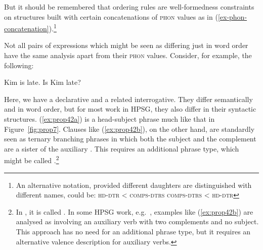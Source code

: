 \documentclass[output=paper,biblatex,babelshorthands,newtxmath,draftmode,colorlinks,citecolor=brown]{langscibook}
\begin{document}
\eal\label{ex:prop41}
\ex\label{ex:prop41a}
\ex\label{ex:prop41b}
\zl
%
But it should be remembered that ordering rules are well-formedness constraints on structures built with certain concatenations of \textsc{phon} values as in (\ref{ex-phon-concatenation}).\footnote{%
   An alternative notation, provided different daughters are distinguished with different names, could be:
   \eal
   \ex \textsc{hd-dtr} < \textsc{comps-dtrs}
   \ex \textsc{comps-dtrs} < \textsc{hd-dtr}
   \zl
}

Not all pairs of expressions which might be seen as differing just in word order have the same
analysis apart from their \textsc{phon} values.\label{page-properties:aux-inversion} Consider, for example, the following:

\eal\label{ex:prop42}
\ex\label{ex:prop42a}
Kim is late.
\ex\label{ex:prop42b}
Is Kim late?
\zl

\noindent
Here, we have a declarative and a related interrogative. They differ semantically and in word order,
but for most work in HPSG, they also differ in their syntactic structures. (\ref{ex:prop42a}) is a
head-subject phrase much like that in Figure~\ref{fig:prop7}. Clauses like (\ref{ex:prop42b}), on
the other hand, are standardly seen as ternary branching phrases in which both the subject and the
complement are a sister of the auxiliary \citep[40]{ps2}. This requires an additional phrase type,
which might be called .\footnote{In \citet[36]{GSag2000a-u}, it
  is called . In some HPSG work, e.g.\ \citet[409--414]{SWB2003a}, examples like
  (\ref{ex:prop42b}) are analysed as involving an auxiliary verb with two complements and no
  subject. This approach has no need for an additional phrase type, but it requires an alternative
  valence description for auxiliary verbs.}
%
\end{document}
